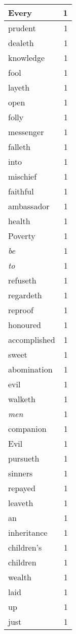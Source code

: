 \begin{center}
\begin{longtable}{l|r}
Every & 1\\ \hline 
prudent & 1\\ \hline 
dealeth & 1\\ \hline 
knowledge & 1\\ \hline 
fool & 1\\ \hline 
layeth & 1\\ \hline 
open & 1\\ \hline 
folly & 1\\ \hline 
messenger & 1\\ \hline 
falleth & 1\\ \hline 
into & 1\\ \hline 
mischief & 1\\ \hline 
faithful & 1\\ \hline 
ambassador & 1\\ \hline 
health & 1\\ \hline 
Poverty & 1\\ \hline 
\emph{be} & 1\\ \hline 
\emph{to} & 1\\ \hline 
refuseth & 1\\ \hline 
regardeth & 1\\ \hline 
reproof & 1\\ \hline 
honoured & 1\\ \hline 
accomplished & 1\\ \hline 
sweet & 1\\ \hline 
abomination & 1\\ \hline 
evil & 1\\ \hline 
walketh & 1\\ \hline 
\emph{men} & 1\\ \hline 
companion & 1\\ \hline 
Evil & 1\\ \hline 
pursueth & 1\\ \hline 
sinners & 1\\ \hline 
repayed & 1\\ \hline 
leaveth & 1\\ \hline 
an & 1\\ \hline 
inheritance & 1\\ \hline 
children's & 1\\ \hline 
children & 1\\ \hline 
wealth & 1\\ \hline 
laid & 1\\ \hline 
up & 1\\ \hline 
just & 1\\ \hline 

\end{longtable}
\end{center}
